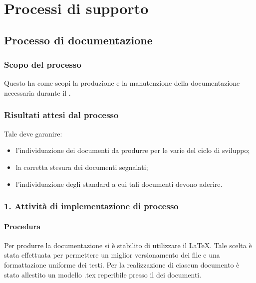 \section{Processi di supporto}
\subsection{Processo di documentazione}


\subsubsection{Scopo del processo}
Questo  ha come scopi la produzione e la manutenzione della documentazione necessaria durante il .
\subsubsection{Risultati attesi dal processo}
Tale  deve garanire:
\begin{itemize}
\item l'individuazione dei documenti da produrre per le varie  del ciclo di sviluppo;
\item la corretta stesura dei documenti segnalati;
\item l'individuazione degli standard a cui tali documenti devono aderire.
\end{itemize}


\subsubsection{1. Attivit\`a di implementazione di processo}    %
  \paragraph*{Procedura}
  Per produrre la documentazione si è stabilito di utilizzare il  \LaTeX. Tale scelta è stata effettuata per permettere un miglior versionamento dei file e una formattazione uniforme dei testi.
  Per la realizzazione di ciascun documento \`e stato allestito un modello .tex reperibile presso il  dei documenti.

